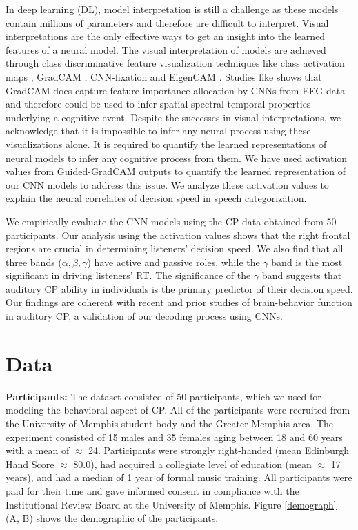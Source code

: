 \documentclass{article}
\begin{document}
In deep learning (DL), model interpretation is still a challenge as these models contain millions of parameters and therefore are difficult to interpret. Visual interpretations are the only effective ways to get an insight into the learned features of a neural model. The visual interpretation of models are achieved through class discriminative feature visualization techniques like class activation maps \cite{CAM}, GradCAM \cite{gradcam}, CNN-fixation \cite{cnn_fixation} and EigenCAM \cite{EigenCAM}. Studies like \cite{eeg_cnn_gradcam, eeg_cnn_gradcam2, eeg_cnn_gradcam3} shows that GradCAM does capture feature importance allocation by CNNs from EEG data and therefore could be used to infer spatial-spectral-temporal properties underlying a cognitive event. Despite the successes in visual interpretations, we acknowledge that it is impossible to infer any neural process using these visualizations alone. It is required to quantify the learned representations of neural models to infer any cognitive process from them. We have used activation values from Guided-GradCAM outputs to quantify the learned representation of our CNN models to address this issue. We analyze these activation values to explain the neural correlates of decision speed in speech categorization.

We empirically evaluate the CNN models using the CP data obtained from 50 participants. Our analysis using the activation values shows that the right frontal regions are crucial in determining listeners' decision speed. We also find that all three bands ($\alpha, \beta, \gamma$) have active and passive roles, while the $\gamma$ band is the most significant in driving listeners' RT. The significance of the $\gamma$ band suggests that auditory CP ability in individuals is the primary predictor of their decision speed. Our findings are coherent with recent and prior studies of brain-behavior function in auditory CP, a validation of our decoding process using CNNs.


\section{Data}

\textbf{Participants:} The dataset consisted of 50 participants, which we used for modeling the behavioral aspect of CP. All of the participants were recruited from the University of Memphis student body and the Greater Memphis area. The experiment consisted of 15 males and 35 females aging between 18 and 60 years with a mean of $\approx$ 24. Participants were strongly right-handed (mean Edinburgh Hand Score $\approx$ 80.0), had acquired a collegiate level of education (mean $\approx$ 17 years), and had a median of 1 year of formal music training. All participants were paid for their time and gave informed consent in compliance with the Institutional Review Board at the University of Memphis. Figure \ref{demograph} (A, B) shows the demographic of the participants.
\end{document}
